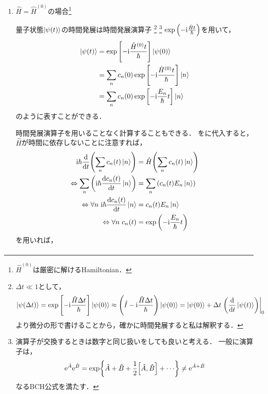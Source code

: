 \documentclass{report}
\begin{document}
  \begin{enumerate}
    \item $\hat{H} = \hat{H}^{(0)}$の場合\footnote{$\hat{H}^{(0)}$は厳密に解けるHamiltonian．}\par
      量子状態$\ket{\psi(t)}$の時間発展は時間発展演算子
      \footnote{
        $\Delta t \ll 1$として，
        \begin{align*}
          \ket{\psi(\Delta t)} = \exp\qty[-\mathrm{i}\frac{\hat{H}\Delta t}{\hbar}]\ket{\psi(0)} \approx\qty(\hat{I} - \mathrm{i}\frac{\hat{H}\Delta t}{\hbar})\ket{\psi(0)} 
          = \ket{\psi(0)} + \Delta t \left.\qty(\dv{t}\ket{\psi(t)})\right|_0
        \end{align*}
        より微分の形で書けることから，確かに時間発展すると私は解釈する．}
      \footnote{
        演算子が交換するときは数字と同じ扱いをしても良いと考える．
        一般に演算子は，
        \begin{align*}
          \mathrm{e}^{\hat{A}}\mathrm{e}^{\hat{B}} = \exp{\hat{A} + \hat{B} + \frac{1}{2}\qty[\hat{A},\hat{B}] + \cdots}\neq\mathrm{e}^{\hat{A} + \hat{B}}
        \end{align*}
        なるBCH公式を満たす．
      }
      $\exp\qty(-\mathrm{i}\frac{\hat{H}t}{\hbar})$を用いて，
      \begin{align}
        \ket{\psi(t)} &= \exp\qty[-\mathrm{i}\frac{\hat{H}^{(0)}t}{\hbar}]\ket{\psi(0)} \\
        &= \sum_{n}c_n(0)\exp\qty[-\mathrm{i}\frac{\hat{H}^{(0)}t}{\hbar}]\ket{n} \\
        &= \sum_{n}c_n(0)\exp\qty[-\mathrm{i}\frac{E_n}{\hbar}t]\ket{n}
      \end{align}
      のように表すことができる．
      \par
      時間発展演算子を用いることなく計算することもできる．
      をに代入すると，$\hat{H}$が時間に依存しないことに注意すれば，
      \begin{align}
        \mathrm{i}\hbar\dv{t}\qty(\sum_{n}c_n(t)\ket{n}) &= \hat{H}\qty(\sum_{n}c_n(t)\ket{n}) \label{naive-solution-to-decide-ct}\\ 
        \Leftrightarrow \sum_{n}\qty(\mathrm{i}\hbar\dv{c_n(t)}{t}\ket{n}) &= \sum_{n}\qty(c_n(t)E_n\ket{n}) \\ 
        \Leftrightarrow \forall n\ \mathrm{i}\hbar\dv{c_n(t)}{t}\ket{n} &= c_n(t)E_n\ket{n} \\ 
        \Leftrightarrow \forall n\ c_n(t) &= \exp\qty(-\mathrm{i}\frac{E_n}{\hbar}t)
      \end{align}
      を用いれば，
      \begin{align}

\end{align}
\end{enumerate}
\end{document}
